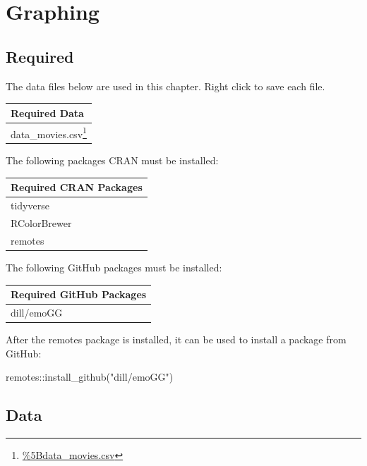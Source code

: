 \documentclass[
]{krantz}
\makeatletter
\newenvironment{Shaded}{\begin{snugshade}}{\end{snugshade}}
\newcommand{\FunctionTok}[1]{\textcolor[rgb]{0,0,0}{#1}}
\newcommand{\NormalTok}[1]{#1}
\newcommand{\SpecialCharTok}[1]{\textcolor[rgb]{0,0,0}{#1}}
\newcommand{\StringTok}[1]{\textcolor[rgb]{0.5,0.5,0.5}{#1}}
\renewcommand{\href}[2]{#2\footnote{\url{#1}}}
\newenvironment{kframe}{%
\medskip{}
\setlength{\fboxsep}{.8em}
 \def\at@end@of@kframe{}%
 \ifinner\ifhmode%
  \def\at@end@of@kframe{\end{minipage}}%
  \begin{minipage}{\columnwidth}%
 \fi\fi%
 \def\FrameCommand##1{\hskip\@totalleftmargin \hskip-\fboxsep
 \colorbox{shadecolor}{##1}\hskip-\fboxsep
     \hskip-\linewidth \hskip-\@totalleftmargin \hskip\columnwidth}%
 \MakeFramed {\advance\hsize-\width
   \@totalleftmargin\z@ \linewidth\hsize
   \@setminipage}}%
 {\par\unskip\endMakeFramed%
 \at@end@of@kframe}
\renewenvironment{Shaded}{\begin{kframe}}{\end{kframe}}
\makeatother
\begin{document}
\hypertarget{graphing}{%
\chapter{Graphing}\label{graphing}}

\hypertarget{required-2}{%
\section{Required}\label{required-2}}

The data files below are used in this chapter. Right click to save each file.

\begin{longtable}[]{@{}l@{}}
\toprule
Required Data \\
\midrule
\endhead
\href{\%5Bdata_movies.csv}{data\_movies.csv} \\
\bottomrule
\end{longtable}

The following packages CRAN must be installed:

\begin{longtable}[]{@{}l@{}}
\toprule
Required CRAN Packages \\
\midrule
\endhead
tidyverse \\
RColorBrewer \\
remotes \\
\bottomrule
\end{longtable}

The following GitHub packages must be installed:

\begin{longtable}[]{@{}l@{}}
\toprule
Required GitHub Packages \\
\midrule
\endhead
dill/emoGG \\
\bottomrule
\end{longtable}

After the remotes package is installed, it can be used to install a package from GitHub:

\begin{Shaded}
\begin{Highlighting}[]
\NormalTok{remotes}\SpecialCharTok{::}\FunctionTok{install\_github}\NormalTok{(}\StringTok{"dill/emoGG"}\NormalTok{)}
\end{Highlighting}
\end{Shaded}

\hypertarget{data}{%
\section{Data}\label{data}}
\end{document}
